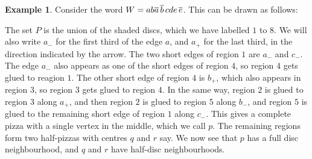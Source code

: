 \documentclass[reqno]{amsart}
\theoremstyle{definition}
\newtheorem{example}[theorem]{Example}
\begin{document}
\begin{example}\label{eg-pizza}
 Consider the word $W=ab\overline{a}\,\overline{b}\,cde\,\overline{e}$.  This can be drawn as follows:
 \begin{center}
 \end{center}

 The set $P$ is the union of the shaded discs, which we have labelled
 $1$ to $8$.  We will also write $a_-$ for the first third of the edge
 $a$, and $a_+$ for the last third, in the direction indicated by the
 arrow.  The two short edges of region $1$ are $a_-$ and $c_-$.  The
 edge $a_-$ also appears as one of the short edges of region $4$, so
 region $4$ gets glued to reagion $1$.  The other short edge of region
 $4$ is $b_+$, which also appears in region $3$, so region $3$ gets
 glued to region $4$.  In the same way, region $2$ is glued to region
 $3$ along $a_+$, and then region $2$ is glued to region $5$ along
 $b_-$, and region $5$ is glued to the remaining short edge of region
 $1$ along $c_-$.  This gives a complete pizza with a single vertex in
 the middle, which we call $p$.  The remaining regions form two
 half-pizzas with centres $q$ and $r$ say.  We now see that $p$ has a
 full disc neighbourhood, and $q$ and $r$ have half-disc
 neighbourhoods. 


\end{example}
\end{document}
